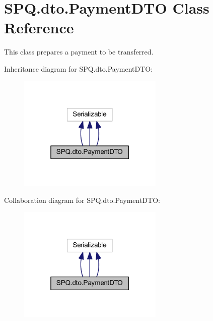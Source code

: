 \hypertarget{class_s_p_q_1_1dto_1_1_payment_d_t_o}{}\section{S\+P\+Q.\+dto.\+Payment\+D\+TO Class Reference}
\label{class_s_p_q_1_1dto_1_1_payment_d_t_o}


This class prepares a payment to be transferred.  




Inheritance diagram for S\+P\+Q.\+dto.\+Payment\+D\+TO\+:\nopagebreak
\begin{figure}[H]
\begin{center}
\leavevmode
\includegraphics[width=196pt]{class_s_p_q_1_1dto_1_1_payment_d_t_o__inherit__graph}
\end{center}
\end{figure}


Collaboration diagram for S\+P\+Q.\+dto.\+Payment\+D\+TO\+:\nopagebreak
\begin{figure}[H]
\begin{center}
\leavevmode
\includegraphics[width=196pt]{class_s_p_q_1_1dto_1_1_payment_d_t_o__coll__graph}
\end{center}
\end{figure}
